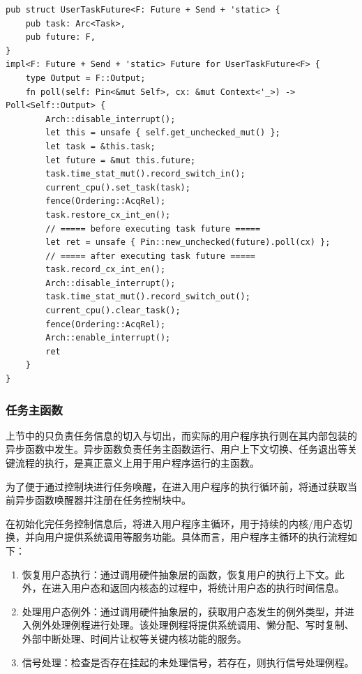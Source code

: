 \documentclass{article}
\begin{document}
\begin{lstlisting}
pub struct UserTaskFuture<F: Future + Send + 'static> {
    pub task: Arc<Task>,
    pub future: F,
}
impl<F: Future + Send + 'static> Future for UserTaskFuture<F> {
    type Output = F::Output;
    fn poll(self: Pin<&mut Self>, cx: &mut Context<'_>) -> Poll<Self::Output> {
        Arch::disable_interrupt();
        let this = unsafe { self.get_unchecked_mut() };
        let task = &this.task;
        let future = &mut this.future;
        task.time_stat_mut().record_switch_in();
        current_cpu().set_task(task);
        fence(Ordering::AcqRel);
        task.restore_cx_int_en();
        // ===== before executing task future =====
        let ret = unsafe { Pin::new_unchecked(future).poll(cx) };
        // ===== after executing task future =====
        task.record_cx_int_en();
        Arch::disable_interrupt();
        task.time_stat_mut().record_switch_out();
        current_cpu().clear_task();
        fence(Ordering::AcqRel);
        Arch::enable_interrupt();
        ret
    }
}
\end{lstlisting}

\subsubsection{任务主函数}

上节中的只负责任务信息的切入与切出，而实际的用户程序执行则在其内部包装的异步函数中发生。异步函数负责任务主函数运行、用户上下文切换、任务退出等关键流程的执行，是真正意义上用于用户程序运行的主函数。

为了便于通过控制块进行任务唤醒，在进入用户程序的执行循环前，将通过获取当前异步函数唤醒器并注册在任务控制块中。

在初始化完任务控制信息后，将进入用户程序主循环，用于持续的内核/用户态切换，并向用户提供系统调用等服务功能。具体而言，用户程序主循环的执行流程如下：

\begin{enumerate}
    \item 恢复用户态执行：通过调用硬件抽象层的函数，恢复用户的执行上下文。此外，在进入用户态和返回内核态的过程中，将统计用户态的执行时间信息。
    \item 处理用户态例外：通过调用硬件抽象层的，获取用户态发生的例外类型，并进入例外处理例程进行处理。该处理例程将提供系统调用、懒分配、写时复制、外部中断处理、时间片让权等关键内核功能的服务。
    \item 信号处理：检查是否存在挂起的未处理信号，若存在，则执行信号处理例程。
\end{enumerate}
\end{document}
